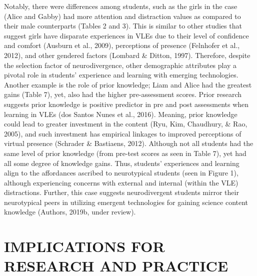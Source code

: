 \documentclass[11.5pt]{sig-alternate} %
\begin{document}
\begin{large}
Notably, there were differences among students, such as the girls in the case (Alice and Gabby) had more attention and distraction values as compared to their male counterparts (Tables 2 and 3). This is similar to other studies that suggest girls have disparate experiences in VLEs due to their level of confidence and comfort (Ausburn et al., 2009), perceptions of presence (Felnhofer et al., 2012), and other gendered factors (Lombard \& Ditton, 1997). Therefore, despite the selection factor of neurodivergence, other demographic attributes play a pivotal role in students’ experience and learning with emerging technologies. Another example is the role of prior knowledge; Liam and Alice had the greatest gains (Table 7), yet, also had the higher pre-assessment scores. Prior research suggests prior knowledge is positive predictor in pre and post assessments when learning in VLEs (dos Santos Nunes et al., 2016). Meaning, prior knowledge could lead to greater investment in the content (Ryu, Kim, Chaudhury, \& Rao, 2005), and such investment has empirical linkages to improved perceptions of virtual presence (Schrader \& Bastiaens, 2012). Although not all students had the same level of prior knowledge (from pre-test scores as seen in Table 7), yet had all some degree of knowledge gains. Thus, students’ experiences and learning align to the affordances ascribed to neurotypical students (seen in Figure 1), although experiencing concerns with external and internal (within the VLE) distractions. Further, this case suggests neurodivergent students mirror their neurotypical peers in utilizing emergent technologies for gaining science content knowledge (Authors, 2019b, under review).  

\section*{IMPLICATIONS FOR RESEARCH AND PRACTICE}


\end{large}
\end{document}
